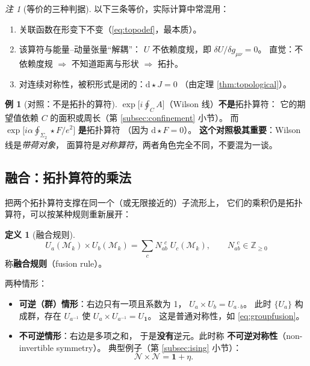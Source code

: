 \documentclass[UTF8,a4paper,11pt]{ctexart}
\theoremstyle{plain}
\theoremstyle{definition}
\newtheorem{definition}{定义}[section]
\newtheorem{example}{例}[section]
\theoremstyle{remark}
\newtheorem{remark}{注}[section]
\newcommand{\ext}{\mathrm{d}}          %
\newcommand{\hs}{\star}                %
\newcommand{\ZZ}{\mathbb{Z}}
\newcommand{\Mfd}{\mathcal{M}}
\newcommand{\Ssurf}{\Sigma}
\newcommand{\en}[1]{\textsf{#1}}       %
\newcommand{\Uop}{U}
\begin{document}
\begin{remark}[等价的三种判据]
以下三条等价，实际计算中常混用：
\begin{enumerate}[label=(\roman*)]
  \item 关联函数在形变下不变（\eqref{eq:topodef}，最本质）。
  \item 该算符与能量--动量张量“解耦”：
        $\Uop$ 不依赖度规，即 $\delta\Uop/\delta g_{\mu\nu}=0$。
        直觉：不依赖度规 $\Rightarrow$ 不知道距离与形状 $\Rightarrow$ 拓扑。
  \item 对连续对称性，被积形式是闭的：$\ext\hs J=0$
        （由定理 \ref{thm:topological}）。
\end{enumerate}
\end{remark}

\begin{example}[对照：不是拓扑的算符]
$\exp\big[i\oint_C A\big]$（Wilson 线）\textbf{不是}拓扑算符：
它的期望值依赖 $C$ 的面积或周长（第 \ref{subsec:confinement} 小节）。
而 $\exp\big[i\alpha\oint_{\Ssurf_2}\hs F/e^2\big]$ \textbf{是}拓扑算符
（因为 $\ext\hs F=0$）。
\textbf{这个对照极其重要}：Wilson 线是\emph{带荷对象}，
面算符是\emph{对称算符}，两者角色完全不同，不要混为一谈。
\end{example}

\subsection{融合：拓扑算符的乘法}
\label{subsec:fusion}

把两个拓扑算符支撑在同一个（或无限接近的）子流形上，
它们的乘积仍是拓扑算符，可以按某种规则重新展开：

\begin{definition}[融合规则]
\begin{equation}
  \Uop_a(\Mfd_k)\times \Uop_b(\Mfd_k)
  =\sum_c N_{ab}^{\ \ c}\;\Uop_c(\Mfd_k),
  \qquad N_{ab}^{\ \ c}\in\ZZ_{\ge0}
  \label{eq:fusion}
\end{equation}
称\textbf{融合规则}（\en{fusion rule}）。
\end{definition}

两种情形：

\begin{itemize}
  \item \textbf{可逆（群）情形}：右边只有一项且系数为 1，
        $\Uop_a\times\Uop_b=\Uop_{a\cdot b}$。
        此时 $\{\Uop_a\}$ 构成群，存在 $\Uop_{a^{-1}}$ 使
        $\Uop_a\times\Uop_{a^{-1}}=\Uop_{\mathbf 1}$。
        这是普通对称性，如 \eqref{eq:groupfusion}。
  \item \textbf{不可逆情形}：右边是多项之和，
        于是\textbf{没有}逆元。此时称
        \textbf{不可逆对称性}（\en{non-invertible symmetry}）。
        典型例子（第 \ref{subsec:ising} 小节）：
        \begin{equation}
          \mathcal N\times\mathcal N=\mathbf 1+\eta .
          \label{eq:isingfusionpreview}
        \end{equation}
\end{itemize}
\end{document}

